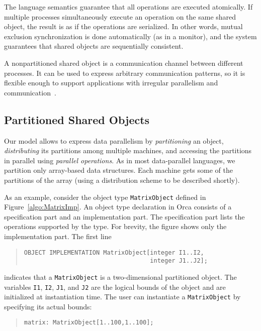 \documentclass{acmtrans2e}
\begin{document}
The language semantics guarantee that all operations are executed
atomically.  If multiple processes simultaneously execute an operation
on the same shared object, the result is as if the operations are
serialized. In other words, mutual exclusion synchronization is done
automatically (as in a monitor), and the system guarantees that shared
objects are sequentially consistent.

A nonpartitioned shared object is a communication channel
between different processes. It can be used to express arbitrary
communication patterns, so it is flexible enough to support
applications with irregular parallelism and
communication~\cite{Bal:1998,wilson96}.

\subsection{Partitioned Shared Objects}
\label{sec:pso}

Our model allows to express data parallelism by {\em partitioning} an
object, \emph{distributing} its partitions among multiple machines,
and accessing the partitions in parallel using \emph{parallel
operations}. As in most data-parallel languages, we partition only
array-based data structures. Each machine gets some of the partitions
of the array (using a distribution scheme to be described shortly).

As an example, consider the object type \verb+MatrixObject+
defined in Figure~\ref{algo:MatrixImp}. An object type declaration
in Orca consists of a specification part and an implementation part.
The specification part lists the operations supported by the type.
For brevity, the figure shows only the implementation part.
The first line

\begin{quote}
\begin{verbatim}
OBJECT IMPLEMENTATION MatrixObject[integer I1..I2,
                                   integer J1..J2];
\end{verbatim}
\end{quote}
indicates that a \verb+MatrixObject+ is a two-dimensional partitioned object.
The variables \verb+I1+, \verb+I2+, \verb+J1+, and \verb+J2+
are the logical bounds of the object and are initialized at
instantiation time. The user can instantiate a \verb+MatrixObject+ by
specifying its actual bounds:

\begin{quote}
\begin{verbatim}
matrix: MatrixObject[1..100,1..100];
\end{verbatim}
\end{quote}
\end{document}
